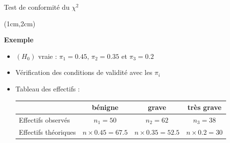 \documentclass{beamer}
\begin{document}
\begin{frame}{Test de conformité du $\chi^2$}
\begin{textblock*}{\textwidth}(1cm,2cm)

\begin{center}{\bf \Large Exemple} \end{center}
\begin{itemize}
\item $(H_0)$  vraie : $\pi_1=0.45$, $\pi_2=0.35$ et $\pi_3=0.2$

\item Vérification des conditions de validité avec les $\pi_i$ \\

\item Tableau des effectifs : \\
\vspace{0.5cm}
\small
\hspace{-1.2cm}
\begin{tabular}{|l|c|c|c|}
\hline
        & bénigne & grave & tr\`es grave\\
\hline
Effectifs observés & $n_1=50$ & $n_2=62$ & $n_3=38$ \\
\hline
Effectifs théoriques & $n\times 0.45=67.5$ & $n\times 0.35=52.5$ & $n\times 0.2=30$ \\
\hline
\end{tabular}
\\
\end{itemize}

\end{textblock*}

\end{frame}

\end{document}

